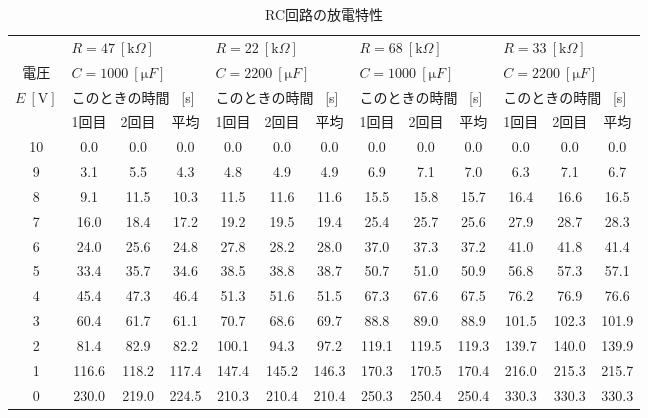 \documentclass[uplatex]{jsarticle}
\begin{document}
			\begin{table}[h]
				\centering
				\small
				\caption{RC回路の放電特性}
				\begin{tabular}{c|ccc|ccc|ccc|ccc} \hline \hline
					 & \multicolumn{3}{l|}{$R = 47 \ [\mathrm k \Omega]$} & \multicolumn{3}{l|}{$R = 22 \ [\mathrm k \Omega]$} & \multicolumn{3}{l|}{$R = 68 \ [\mathrm k \Omega]$} & \multicolumn{3}{l}{$R = 33 \ [\mathrm k \Omega]$} \\
					電圧 & \multicolumn{3}{l|}{$C = 1000 \ [\mathrm \mu F]$} & \multicolumn{3}{l|}{$C = 2200 \ [\mathrm \mu F]$} & \multicolumn{3}{l|}{$C = 1000 \ [\mathrm \mu F]$} & \multicolumn{3}{l}{$C = 2200 \ [\mathrm \mu F]$} \\
					$E \ [\mathrm V]$ & \multicolumn{3}{l|}{このときの時間 \ [s]} & \multicolumn{3}{l|}{このときの時間 \ [s]} & \multicolumn{3}{l|}{このときの時間 \ [s]} & \multicolumn{3}{l}{このときの時間 \ [s]} \\ \cline{2-13}
					   & 1回目 & 2回目 & 平均  & 1回目 & 2回目 & 平均  & 1回目 & 2回目 & 平均  & 1回目 & 2回目 & 平均 \\ \hline
					10 & 0.0   & 0.0   & 0.0   & 0.0   & 0.0   & 0.0   & 0.0   & 0.0   & 0.0   & 0.0   & 0.0   & 0.0 \\ \hline
					9  & 3.1   & 5.5   & 4.3   & 4.8   & 4.9   & 4.9   & 6.9   & 7.1   & 7.0   & 6.3   & 7.1   & 6.7 \\ \hline
					8  & 9.1   & 11.5  & 10.3  & 11.5  & 11.6  & 11.6  & 15.5  & 15.8  & 15.7  & 16.4  & 16.6  & 16.5 \\ \hline
					7  & 16.0  & 18.4  & 17.2  & 19.2  & 19.5  & 19.4  & 25.4  & 25.7  & 25.6  & 27.9  & 28.7  & 28.3 \\ \hline
					6  & 24.0  & 25.6  & 24.8  & 27.8  & 28.2  & 28.0  & 37.0  & 37.3  & 37.2  & 41.0  & 41.8  & 41.4 \\ \hline
					5  & 33.4  & 35.7  & 34.6  & 38.5  & 38.8  & 38.7  & 50.7  & 51.0  & 50.9  & 56.8  & 57.3  & 57.1 \\ \hline
					4  & 45.4  & 47.3  & 46.4  & 51.3  & 51.6  & 51.5  & 67.3  & 67.6  & 67.5  & 76.2  & 76.9  & 76.6 \\ \hline
					3  & 60.4  & 61.7  & 61.1  & 70.7  & 68.6  & 69.7  & 88.8  & 89.0  & 88.9  & 101.5 & 102.3 & 101.9 \\ \hline
					2  & 81.4  & 82.9  & 82.2  & 100.1 & 94.3  & 97.2  & 119.1 & 119.5 & 119.3 & 139.7 & 140.0 & 139.9 \\ \hline
					1  & 116.6 & 118.2 & 117.4 & 147.4 & 145.2 & 146.3 & 170.3 & 170.5 & 170.4 & 216.0 & 215.3 & 215.7 \\ \hline
					0  & 230.0 & 219.0 & 224.5 & 210.3 & 210.4 & 210.4 & 250.3 & 250.4 & 250.4 & 330.3 & 330.3 & 330.3 \\ \hline
				\end{tabular}
			\end{table}
	\clearpage
\end{document}
